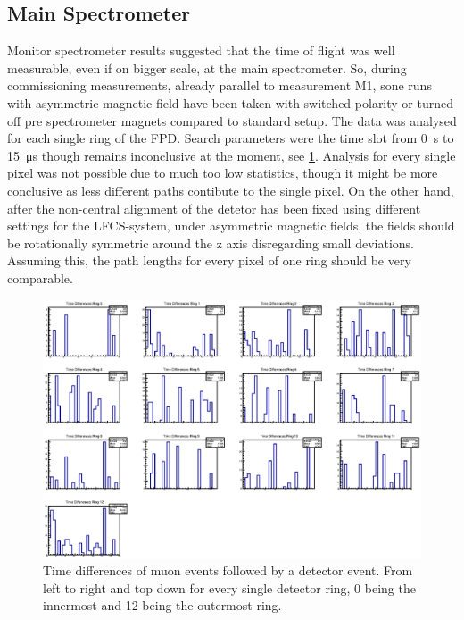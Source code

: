   \subsection{Main Spectrometer}
  \label{ch:Analysis:sec:Monitor Spectrometer Measurements:subsec:Main Spectrometer}
  
  Monitor spectrometer results suggested that the time of flight was well measurable, even if on bigger scale, at the main spectrometer. So, during commissioning measurements, already parallel to measurement M1, sone runs with asymmetric magnetic field have been taken with switched polarity or turned off pre spectrometer magnets compared to standard setup.
  The data was analysed for each single ring of the FPD. Search parameters were the time slot from \SI{0}{\second} to \SI{15}{\micro\second} though remains inconclusive at the moment, see \ref{fig:mainSpec:allRings}. Analysis for every single pixel was not possible due to much too low statistics, though it might be more conclusive as less different paths contibute to the single pixel. On the other hand, after the non-central alignment of the detetor has been fixed using different settings for the LFCS-system, under asymmetric magnetic fields, the fields should be rotationally symmetric around the z axis disregarding small deviations. Assuming this, the path lengths for every pixel of one ring should be very comparable.
  
  \begin{figure}
  \centering
  	\includegraphics[width = 0.9 \textwidth]{graphics/mainSpec/mainSpecRings.eps}
  	\caption{Time differences of muon events followed by a detector event. From left to right and top down for every single detector ring, 0 being the innermost and 12 being the outermost ring.}
  	\label{fig:mainSpec:allRings}
  \end{figure}

